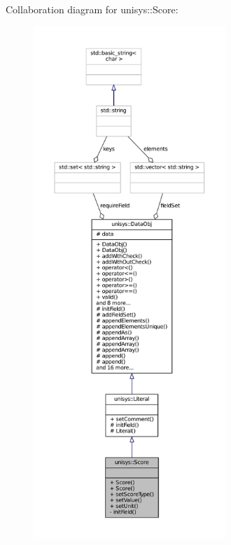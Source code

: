 Collaboration diagram for unisys\-:\-:Score\-:
\nopagebreak
\begin{figure}[H]
\begin{center}
\leavevmode
\includegraphics[height=550pt]{classunisys_1_1Score__coll__graph}
\end{center}
\end{figure}
